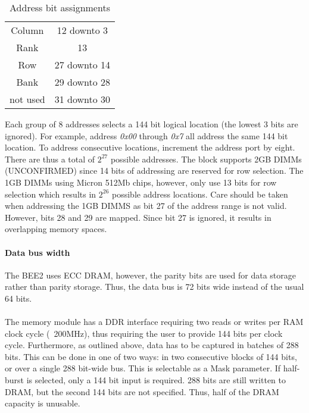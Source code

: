 {\begin{table*}[h]
\begin{tabular}{|c|c|}
			Column 			&		12 downto 3	\\

			Rank 				&		13					\\

			Row 				&		27 downto 14	\\

			Bank 				&		29 downto 28	\\

			not used 		&		31 downto 30	\\

			\hline

		\end{tabular}

	\caption{Address bit assignments}

	\label{tab:AddressBitAssignments}

\end{table*}





Each group of 8 addresses selects a 144 bit logical location (the lowest 3 bits are ignored). For example, address \textit{0x00} through \textit{0x7} all address the same 144 bit location. To address consecutive locations, increment the address port by eight. There are thus a total of $2^{27}$ possible addresses. The block supports 2GB DIMMs (UNCONFIRMED) since 14 bits of addressing are reserved for row selection. The 1GB DIMMs using Micron 512Mb chips, however, only use 13 bits for row selection which results in $2^{26}$ possible address locations. Care should be taken when addressing the 1GB DIMMS as bit 27 of the address range is not valid. However, bits 28 and 29 are mapped. Since bit 27 is ignored, it results in overlapping memory spaces.



\paragraph{Data bus width}

The BEE2 uses ECC DRAM, however, the parity bits are used for data storage rather than parity storage. Thus, the data bus is 72 bits wide instead of the usual 64 bits.

\paragraph{}

The memory module has a DDR interface requiring two reads or writes per RAM clock cycle (~200MHz), thus requiring the user to provide 144 bits per clock cycle. Furthermore, as outlined above, data has to be captured in batches of 288 bits. This can be done in one of two ways: in two consecutive blocks of 144 bits, or over a single 288 bit-wide bus. This is selectable as a Mask parameter. If half-burst is selected, only a 144 bit input is required. 288 bits are still written to DRAM, but the second 144 bits are not specified. Thus, half of the DRAM capacity is unusable.



}
